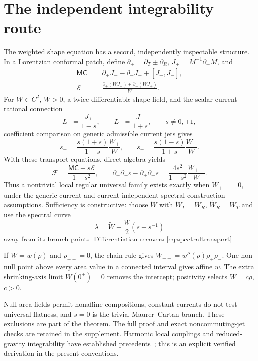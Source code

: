 \documentclass[11pt]{article}
\begin{document}
\section{The independent integrability route}
The weighted shape equation has a second, independently inspectable structure. In a Lorentzian conformal patch, define $\partial_\pm=\partial_T\pm\partial_R$, $J_\pm=M^{-1}\partial_\pm M$, and
\begin{align}
\mathsf{MC}&=\partial_+J_--\partial_-J_++[J_+,J_-],\\
\mathcal E&=\frac{\partial_+(WJ_-)+\partial_-(WJ_+)}W.
\end{align}
For $W\in C^2$, $W>0$, a twice-differentiable shape field, and the scalar-current rational connection
\[
L_+=\frac{J_+}{1-s},\qquad L_-=\frac{J_-}{1+s},\qquad s\ne0,\pm1,
\]
coefficient comparison on generic admissible current jets gives
\begin{equation}\label{eq:spectraltransport}
s_+=\frac{s(1+s)}{1-s}\frac{W_+}{W},\qquad
s_-=\frac{s(1-s)}{1+s}\frac{W_-}{W}.
\end{equation}
With these transport equations, direct algebra yields
\begin{equation}
\boxed{\mathcal F=\frac{\mathsf{MC}-s\mathcal E}{1-s^2},\qquad
\partial_-\partial_+s-\partial_+\partial_-s
=\frac{4s^2}{1-s^2}\frac{W_{+-}}W.}
\end{equation}
Thus a nontrivial local regular universal family exists exactly when $W_{+-}=0$, under the generic-current and current-independent spectral construction assumptions. Sufficiency is constructive: choose $\widetilde W$ with $\widetilde W_T=W_R$, $\widetilde W_R=W_T$ and use the spectral curve
\[
\lambda=\widetilde W+\frac W2(s+s^{-1})
\]
away from its branch points. Differentiation recovers \eqref{eq:spectraltransport}.

If $W=w(\rho)$ and $\rho_{+-}=0$, the chain rule gives $W_{+-}=w''(\rho)\rho_+\rho_-$. One non-null point above every area value in a connected interval gives affine $w$. The extra shrinking-axis limit $W(0^+)=0$ removes the intercept; positivity selects $W=c\rho$, $c>0$.

Null-area fields permit nonaffine compositions, constant currents do not test universal flatness, and $s=0$ is the trivial Maurer--Cartan branch. These exclusions are part of the theorem. The full proof and exact noncommuting-jet checks are retained in the supplement. Harmonic local couplings and reduced-gravity integrability have established precedents~\cite{Hoare,Nicolai}; this is an explicit verified derivation in the present conventions.
\end{document}
